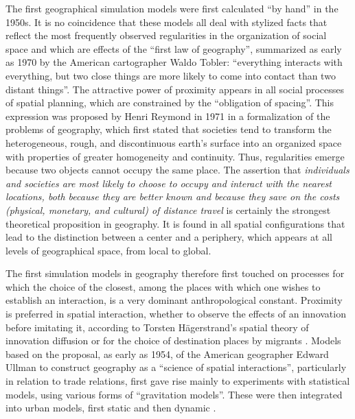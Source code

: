 \documentclass[10pt]{article}
\begin{document}
The first geographical simulation models were first calculated ``by hand'' in the 1950s. It is no coincidence that these models all deal with stylized facts that reflect the most frequently observed regularities in the organization of social space and which are effects of the ``first law of geography'', summarized as early as 1970 by the American cartographer Waldo Tobler: “everything interacts with everything, but two close things are more likely to come into contact than two distant things”. The attractive power of proximity appears in all social processes of spatial planning, which are constrained by the “obligation of spacing”. This expression was proposed by Henri Reymond in 1971 in a formalization of the problems of geography, which first stated that societies tend to transform the heterogeneous, rough, and discontinuous earth’s surface into an organized space with properties of greater homogeneity and continuity. Thus, regularities emerge because two objects cannot occupy the same place. The assertion that \textit{individuals and societies are most likely to choose to occupy and interact with the nearest locations, both because they are better known and because they save on the costs (physical, monetary, and cultural) of distance travel} is certainly the strongest theoretical proposition in geography. It is found in all spatial configurations that lead to the distinction between a center and a periphery, which appears at all levels of geographical space, from local to global.



The first simulation models in geography therefore first touched on processes for which the choice of the closest, among the places with which one wishes to establish an interaction, is a very dominant anthropological constant. Proximity is preferred in spatial interaction, whether to observe the effects of an innovation before imitating it, according to Torsten Hägerstrand’s spatial theory of innovation diffusion \citep{hagerstrand1957migration} or for the choice of destination places by migrants \citep{hagerstrand1957migration,morrill1962development,morrill1963distribution}. Models based on the proposal, as early as 1954, of the American geographer Edward Ullman to construct geography as a ``science of spatial interactions'', particularly in relation to trade relations, first gave rise mainly to experiments with statistical models, using various forms of ``gravitation models''. These were then integrated into urban models, first static \citep{lowry1964model} and then dynamic \citep{clarke1983dynamics,wilson2014complex,allen1981urban,allen2012cities}.
\end{document}
